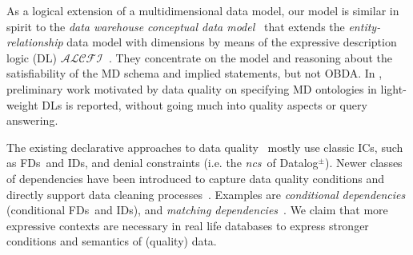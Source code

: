 \documentclass[format=acmsmall, review=false, screen=true]{acmart}
\newcommand{\ignore}[1]{}
\newcommand{\mc}[1]{\mathcal{ #1}}
\newcommand{\dpm}{{Datalog}$^\pm$}
\newcommand{\fds}{FDs}
\newcommand{\ics}{ICs}
\newcommand{\ideps}{IDs}
\newcommand{\ncs}{{\em ncs}}
\begin{document}

\ignore{We admit that our work is also related to some other areas of research, such as multidimensional data models.} As a logical extension  of a multidimensional data model, our model is similar in spirit to the {\em data warehouse conceptual data model}~\cite{franconi99} that extends the  {\em entity-relationship} data model with dimensions by means of the expressive description logic (DL) $\mc{ALCFI}$~\cite{horrocks99}. They concentrate on the model and reasoning about the satisfiability of the MD schema and implied statements, but not OBDA. In \cite{malaki}, preliminary work motivated by data quality on specifying MD ontologies in light-weight DLs is reported, without going much into quality aspects or query answering.
\vspace{0.25cm}


\ignore{Our approach to data quality is declarative.} The existing declarative approaches to data quality~\cite{bertossi13} mostly use classic \ics, such as \fds \ and \ideps, and denial constraints (i.e. the \ncs \ of \dpm).  Newer classes of dependencies have been introduced to capture data quality  conditions and directly support data cleaning processes~\citep{fan08}. Examples are {\em conditional dependencies} (conditional \fds \ and \ideps), and {\em matching dependencies}~\citep{fan09-pvldb,fan11}. We claim that more expressive contexts are necessary in real life databases to express stronger conditions and semantics of (quality) data.
\end{document}
